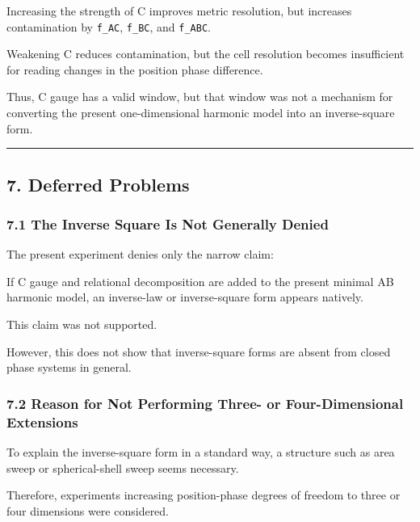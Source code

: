 \documentclass[
]{article}
\newenvironment{Shaded}{}{}
\newcommand{\NormalTok}[1]{#1}
\begin{document}
Increasing the strength of C improves metric resolution, but increases
contamination by \texttt{f\_AC}, \texttt{f\_BC}, and \texttt{f\_ABC}.

Weakening C reduces contamination, but the cell resolution becomes
insufficient for reading changes in the position phase difference.

Thus, C gauge has a valid window, but that window was not a mechanism
for converting the present one-dimensional harmonic model into an
inverse-square form.

\begin{center}\rule{0.5\linewidth}{0.5pt}\end{center}

\subsection{7. Deferred Problems}\label{deferred-problems}

\subsubsection{7.1 The Inverse Square Is Not Generally
Denied}\label{the-inverse-square-is-not-generally-denied}

The present experiment denies only the narrow claim:

\begin{Shaded}
\begin{Highlighting}[]
\NormalTok{If C gauge and relational decomposition are added to the present minimal AB harmonic model,}
\NormalTok{an inverse{-}law or inverse{-}square form appears natively.}
\end{Highlighting}
\end{Shaded}

This claim was not supported.

However, this does not show that inverse-square forms are absent from
closed phase systems in general.

\subsubsection{7.2 Reason for Not Performing Three- or Four-Dimensional
Extensions}\label{reason-for-not-performing-three--or-four-dimensional-extensions}

To explain the inverse-square form in a standard way, a structure such
as area sweep or spherical-shell sweep seems necessary.

Therefore, experiments increasing position-phase degrees of freedom to
three or four dimensions were considered.
\end{document}
